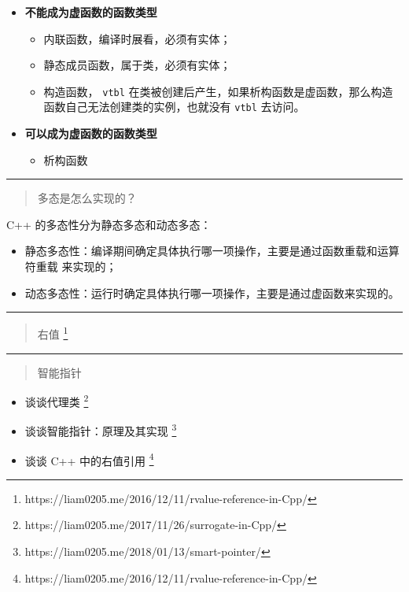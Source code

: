 \begin{itemize}
\item \textbf{不能成为虚函数的函数类型}
  \begin{itemize}
  \item 内联函数，编译时展看，必须有实体；
  \item 静态成员函数，属于类，必须有实体；
  \item 构造函数， \verb|vtbl| 在类被创建后产生，如果析构函数是虚函数，那么构造
    函数自己无法创建类的实例，也就没有 \verb|vtbl| 去访问。
  \end{itemize}
\item \textbf{可以成为虚函数的函数类型}
  \begin{itemize}
  \item 析构函数
  \end{itemize}
\end{itemize}


\noindent\rule[0.25\baselineskip]{\textwidth}{1pt}

\begin{quotation}
  {\color{red}多态是怎么实现的？}
\end{quotation}

C++ 的多态性分为静态多态和动态多态：
\begin{itemize}
\item 静态多态性：编译期间确定具体执行哪一项操作，主要是通过函数重载和运算符重载
  来实现的；
\item 动态多态性：运行时确定具体执行哪一项操作，主要是通过虚函数来实现的。
\end{itemize}




\noindent\rule[0.25\baselineskip]{\textwidth}{1pt}

\begin{quotation}
  {\color{red}右值}%
  \footnote{https://liam0205.me/2016/12/11/rvalue-reference-in-Cpp/}%
\end{quotation}



\noindent\rule[0.25\baselineskip]{\textwidth}{1pt}

\begin{quotation}
  {\color{red}智能指针}
\end{quotation}

\begin{itemize}
\item 谈谈代理类%
  \footnote{https://liam0205.me/2017/11/26/surrogate-in-Cpp/}%
\item 谈谈智能指针：原理及其实现%
  \footnote{https://liam0205.me/2018/01/13/smart-pointer/}%
\item 谈谈 C++ 中的右值引用%
  \footnote{https://liam0205.me/2016/12/11/rvalue-reference-in-Cpp/}%
\end{itemize}



